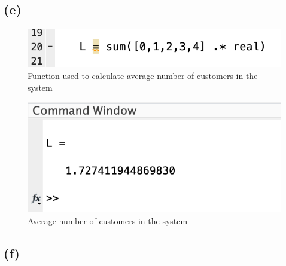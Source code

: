 \documentclass{article}
\begin{document}
\subsection{(e)}
\begin{figure}[H]
    \includegraphics[width=\linewidth]{./imgs/5ecode.png}
    \caption{Function used to calculate average number of customers in the system}
\end{figure}
\begin{figure}[H]
    \includegraphics[width=\linewidth]{./imgs/5eans.png}
    \caption{Average number of customers in the system}
\end{figure}

\subsection{(f)}
\end{document}
